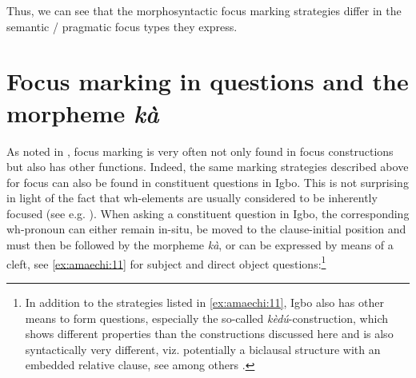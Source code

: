 \documentclass[output=paper,colorlinks,citecolor=brown]{langscibook}
\begin{document}


\enlargethispage{1.0\baselineskip}

Thus, we can see that the morphosyntactic focus marking strategies differ in the semantic / pragmatic focus types they express.

\section{Focus marking in questions and the morpheme \textit{kà}}\label{sec:amaechi:3}

As noted in \citet{FiedlerEtAl2010}, focus marking is very often not only found in focus constructions but also has other functions. Indeed, the same marking strategies described above for focus can also be found in constituent questions in Igbo. This is not surprising in light of the fact that wh-elements are usually considered to be inherently focused (see e.g. \citealt{Rochemont1986, Horvath1986, Tuller1986, Beck2006, Haida2007}). When asking a constituent question in Igbo, the corresponding wh-pronoun can either remain in-situ, be moved to the clause-initial position and must then be followed by the morpheme \textit{kà}, or can be expressed by means of a cleft, see \ref{ex:amaechi:11} for subject and direct object questions:\footnote{In addition to the strategies listed in \ref{ex:amaechi:11}, Igbo also has other means to form questions, especially the so-called \textit{kèd{\'u}}-construction, which shows different properties than the constructions discussed here and is also syntactically very different, viz. potentially a biclausal structure with an embedded relative clause, see among others \citet{Ikekeonwu1987, Ndimele1991, Nwankwegu2015, Ogbulogo1995, Amaechi2018}.}
\end{document}
